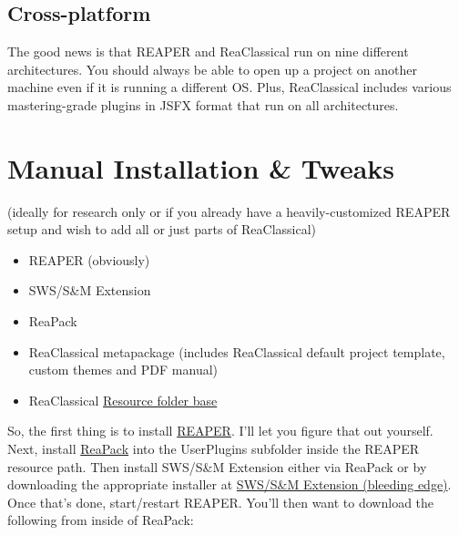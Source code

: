 \documentclass[10pt,american]{article}
\begin{document}
\subsection{Cross-platform}

The good news is that REAPER and ReaClassical run on nine different
architectures. You should always be able to open up a project on another machine
even if it is running a different OS. Plus, ReaClassical includes various
mastering-grade plugins in JSFX format that run on all architectures. 

\pagebreak{}

\section{Manual Installation \& Tweaks}

\noindent (ideally for research only or if you already have a heavily-customized
REAPER setup and wish to add all or just parts of ReaClassical)
\begin{itemize}
\item \begin{flushleft} REAPER (obviously) \par\end{flushleft}
\item \begin{flushleft} SWS/S\&M Extension \par\end{flushleft}
\item \begin{flushleft} ReaPack \par\end{flushleft}
\item \begin{flushleft} ReaClassical metapackage (includes ReaClassical default
project template, custom themes and PDF manual) \par\end{flushleft}
\item \begin{flushleft} ReaClassical
\href{https://github.com/chmaha/ReaClassical/raw/main/Resource\%2520Folders/Resource_Folder_Base.zip}{Resource
folder base} \par\end{flushleft}

\end{itemize}
\noindent\begin{flushleft} So, the first thing is to install
\href{https://www.reaper.fm/download.php}{REAPER}. I'll let you figure that out
yourself. Next, install \href{https://reapack.com/}{ReaPack} into the
UserPlugins subfolder inside the REAPER resource path. Then install SWS/S\&M
Extension either via ReaPack or by downloading the appropriate installer at
\href{https://www.sws-extension.org/download/pre-release/}{SWS/S\&M Extension
(bleeding edge)}. Once that's done, start/restart REAPER. You'll then want to
download the following from inside of ReaPack: \par\end{flushleft}
\end{document}
